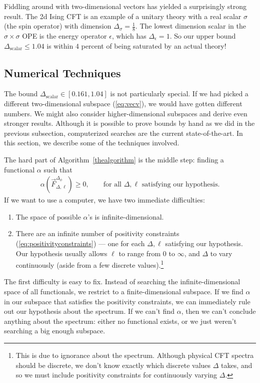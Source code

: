 \documentclass{ws-rv9x6}
\newcommand\be{\begin{eqnarray}}
\newcommand\ee{\end{eqnarray}}
\newcommand\f\phi
\newcommand\e\epsilon
\newcommand\<\langle
\renewcommand\>\rangle
\renewcommand\.{\cdot}
\newcommand\x\times
\newcommand\s\sigma
\newcommand\De{\Delta}
\newcommand\oo\infty
\begin{document}
Fiddling around with two-dimensional vectors has yielded a surprisingly strong result.  The 2d Ising CFT is an example of a unitary theory with a real scalar $\s$ (the spin operator) with dimension $\De_\s=\frac 1 8$.  The lowest dimension scalar in the $\s\x\s$ OPE is the energy operator $\e$, which has $\De_\e=1$.  So our upper bound $\De_\mathrm{scalar}\leq 1.04$ is within $4$ percent of being saturated by an actual theory!

\subsection{Numerical Techniques}
\label{sec:numericaltechniques}

The bound $\De_\mathrm{scalar}\in[0.161,1.04]$ is not particularly special.  If we had picked a different two-dimensional subspace (\ref{eq:vecv}), we would have gotten different numbers.  We might also consider higher-dimensional subspaces and derive even stronger results.  Although it is possible to prove bounds by hand as we did in the previous subsection, computerized searches are the current state-of-the-art.  In this section, we describe some of the techniques involved.

The hard part of Algorithm~\ref{thealgorithm} is the middle step: finding a functional $\alpha$ such that
\be
\label{eq:positivityconstraints}
\alpha(\vec F_{\De,\ell}^{\De_\f}) \geq 0,\qquad\textrm{for all $\De,\ell$ satisfying our hypothesis}.
\ee
If we want to use a computer, we have two immediate difficulties:
\begin{enumerate}
\item The space of possible $\alpha$'s is infinite-dimensional.
\item There are an infinite number of positivity constraints (\ref{eq:positivityconstraints}) --- one for each $\De,\ell$ satisfying our hypothesis.  Our hypothesis usually allows $\ell$ to range from $0$ to $\oo$, and $\De$ to vary continuously (aside from a few discrete values).\footnote{This is due to ignorance about the spectrum. Although physical CFT spectra should be discrete, we don't know exactly which discrete values $\De$ takes, and so we must include positivity constraints for continuously varying $\De$.}
\end{enumerate}

The first difficulty is easy to fix.  Instead of searching the infinite-dimensional space of all functionals, we restrict to a finite-dimensional subspace.  If we find $\alpha$ in our subspace that satisfies the positivity constraints, we can immediately rule out our hypothesis about the spectrum.  If we can't find $\alpha$, then we can't conclude anything about the spectrum: either no functional exists, or we just weren't searching a big enough subspace.
\end{document}
